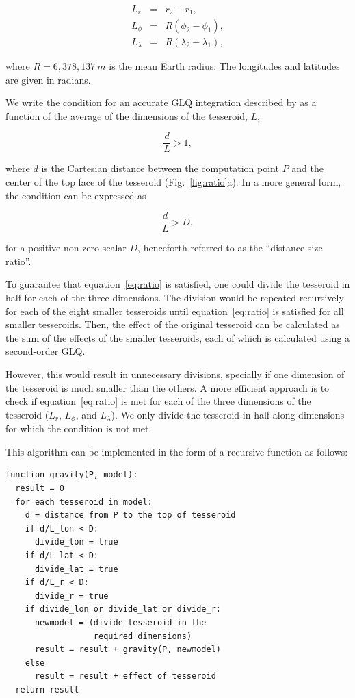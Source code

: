 \begin{eqnarray}
    L_r &=& r_2 - r_1,\\
    L_\phi &=& R(\phi_2 - \phi_1),\\
    L_\lambda &=& R(\lambda_2 - \lambda_1),
\end{eqnarray}

\noindent
where $R=6,378,137\ m$ is the mean Earth radius.
The longitudes and latitudes are given in radians.

We write the condition for an accurate GLQ integration
described by \citet{Ku1977}
as a function of
the average of the dimensions of the tesseroid, $L$,

\begin{equation}
    \frac{d}{L} > 1,
\end{equation}

\noindent
where $d$ is the Cartesian distance
between the computation point $P$
and the center of the top face of the tesseroid
(Fig.~\ref{fig:ratio}a).
In a more general form, the condition can be expressed as

\begin{equation}
    \frac{d}{L} > D,
    \label{eq:ratio}
\end{equation}

\noindent
for a positive non-zero scalar $D$,
henceforth referred to as
the ``distance-size ratio''.

To guarantee that equation~\ref{eq:ratio} is satisfied,
one could divide the tesseroid in half for each of the three dimensions.
The division would be repeated recursively
for each of the eight smaller tesseroids
until equation~\ref{eq:ratio} is satisfied for all smaller tesseroids.
Then, the effect of the original tesseroid can be calculated
as the sum of the
effects of the smaller tesseroids,
each of which is calculated using a second-order GLQ.

However, this would result in unnecessary divisions,
specially if one dimension of the tesseroid is much smaller than the others.
A more efficient approach is
to check if equation~\ref{eq:ratio} is met
for each of the three dimensions of the tesseroid
($L_r$, $L_\phi$, and $L_\lambda$).
We only divide the tesseroid in half
along dimensions for which the condition is not met.

This algorithm can be implemented
in the form of a recursive function
as follows:

\begin{verbatim}
function gravity(P, model):
  result = 0
  for each tesseroid in model:
    d = distance from P to the top of tesseroid
    if d/L_lon < D:
      divide_lon = true
    if d/L_lat < D:
      divide_lat = true
    if d/L_r < D:
      divide_r = true
    if divide_lon or divide_lat or divide_r:
      newmodel = (divide tesseroid in the
                  required dimensions)
      result = result + gravity(P, newmodel)
    else
      result = result + effect of tesseroid
  return result
\end{verbatim}

